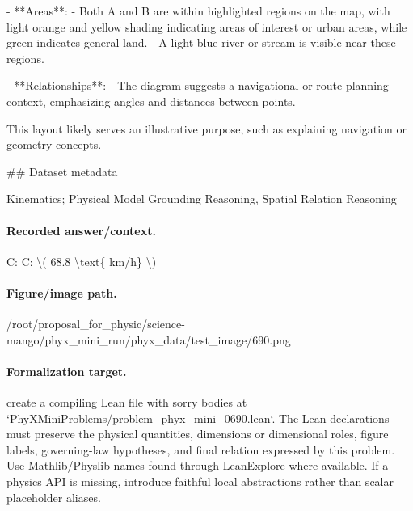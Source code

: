 - **Areas**:
  - Both A and B are within highlighted regions on the map, with light orange and yellow shading indicating areas of interest or urban areas, while green indicates general land.
  - A light blue river or stream is visible near these regions.

- **Relationships**:
  - The diagram suggests a navigational or route planning context, emphasizing angles and distances between points.
  
This layout likely serves an illustrative purpose, such as explaining navigation or geometry concepts.

\#\# Dataset metadata

Kinematics; Physical Model Grounding Reasoning, Spatial Relation Reasoning

\paragraph{Recorded answer/context.}
C: C: \textbackslash{}( 68.8 \textbackslash{}text\{ km/h\} \textbackslash{})

\paragraph{Figure/image path.}
/root/proposal\_for\_physic/science-mango/phyx\_mini\_run/phyx\_data/test\_image/690.png

\paragraph{Formalization target.}
create a compiling Lean file with sorry bodies at `PhyXMiniProblems/problem\_phyx\_mini\_0690.lean`. The Lean declarations must preserve the physical quantities, dimensions or dimensional roles, figure labels, governing-law hypotheses, and final relation expressed by this problem.
Use Mathlib/Physlib names found through LeanExplore where available. If a physics API is missing, introduce faithful local abstractions rather than scalar placeholder aliases.

